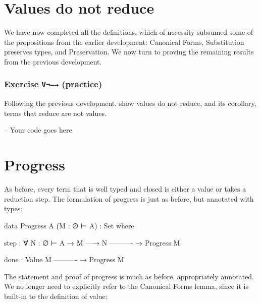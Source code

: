 \hypertarget{values-do-not-reduce}{%
\section{Values do not reduce}\label{values-do-not-reduce}}

We have now completed all the definitions, which of necessity subsumed
some of the propositions from the earlier development: Canonical Forms,
Substitution preserves types, and Preservation. We now turn to proving
the remaining results from the previous development.

\hypertarget{exercise-v-practice}{%
\subsubsection{\texorpdfstring{Exercise \texttt{V¬—→}
(practice)}{Exercise V¬---→ (practice)}}\label{exercise-v-practice}}

Following the previous development, show values do not reduce, and its
corollary, terms that reduce are not values.

\begin{fence}
\begin{code}
-- Your code goes here
\end{code}
\end{fence}

\hypertarget{progress}{%
\section{Progress}\label{progress}}

As before, every term that is well typed and closed is either a value or
takes a reduction step. The formulation of progress is just as before,
but annotated with types:

\begin{fence}
\begin{code}
data Progress {A} (M : ∅ ⊢ A) : Set where

  step : ∀ {N : ∅ ⊢ A}
    → M —→ N
      ----------
    → Progress M

  done :
      Value M
      ----------
    → Progress M
\end{code}
\end{fence}

The statement and proof of progress is much as before, appropriately
annotated. We no longer need to explicitly refer to the Canonical Forms
lemma, since it is built-in to the definition of value:

